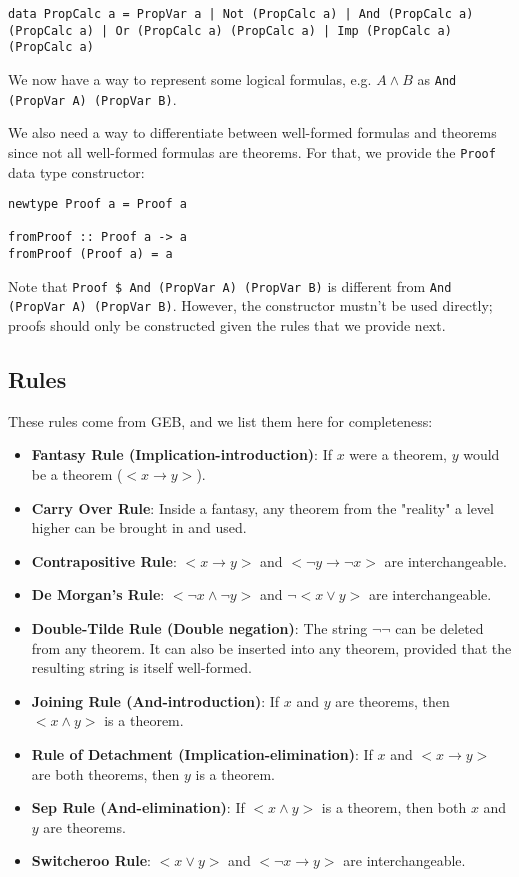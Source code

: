 \documentclass{article}
\begin{document}
\begin{lstlisting}
data PropCalc a = PropVar a | Not (PropCalc a) | And (PropCalc a) (PropCalc a) | Or (PropCalc a) (PropCalc a) | Imp (PropCalc a) (PropCalc a)
\end{lstlisting}

We now have a way to represent some logical formulas, e.g. $A \land B$ as \texttt{And (PropVar A) (PropVar B)}.

We also need a way to differentiate between well-formed formulas and theorems since not all well-formed formulas are theorems. For that, we provide the \texttt{Proof} data type constructor:

\begin{lstlisting}
newtype Proof a = Proof a

fromProof :: Proof a -> a
fromProof (Proof a) = a
\end{lstlisting}

Note that \texttt{Proof \$ And (PropVar A) (PropVar B)} is different from \texttt{And (PropVar A) (PropVar B)}. However, the constructor mustn't be used directly; proofs should only be constructed given the rules that we provide next.

\subsection{Rules}

These rules come from GEB, and we list them here for completeness:

\begin{itemize}
\item \textbf{Fantasy Rule (Implication-introduction)}: If $x$ were a theorem, $y$ would be a theorem ($<x \to y>$).
\item \textbf{Carry Over Rule}: Inside a fantasy, any theorem from the "reality" a level higher can be brought in and used.
\item \textbf{Contrapositive Rule}: $< x \to y>$ and $< \neg y \to \neg x>$ are interchangeable.
\item \textbf{De Morgan's Rule}: $< \neg x \land \neg y>$ and $\neg<x \lor y>$ are interchangeable.
\item \textbf{Double-Tilde Rule (Double negation)}: The string $\neg\neg$ can be deleted from any theorem. It can also be inserted into any theorem, provided that the resulting string is itself well-formed.
\item \textbf{Joining Rule (And-introduction)}: If $x$ and $y$ are theorems, then $<x \land y>$ is a theorem.
\item \textbf{Rule of Detachment (Implication-elimination)}: If $x$ and $<x \to y>$ are both theorems, then $y$ is a theorem.
\item \textbf{Sep Rule (And-elimination)}: If $<x \land y>$ is a theorem, then both $x$ and $y$ are theorems.
\item \textbf{Switcheroo Rule}: $<x \lor y>$ and $<\neg x \to y>$ are interchangeable.
\end{itemize}
\end{document}
